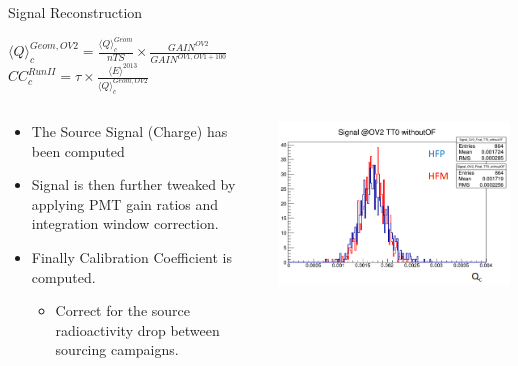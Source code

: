 \documentclass[pdf, 9pt]{beamer}
\begin{document}
  \begin{frame}{Signal Reconstruction}
    \begin{center}
      ${\langle{Q}\rangle}^{Geom,OV2}_{c} = \frac{{\langle{Q}\rangle}^{Geom}_{c}}{nTS} \times \frac{{GAIN}^{OV2}}{{GAIN}^{OV1,OV1+100}}$\\
      \vspace{0.2cm}
      ${CC}^{Run II}_{c} = \tau \times \frac{{\langle{E}\rangle}^{2013}}{{\langle{Q}\rangle}^{Geom, OV2}_{c}}$
    \end{center}
    \begin{columns}[T]
      \begin{column}{0.65\textwidth}
        \begin{itemize}
          \item The Source Signal (Charge) has been computed
          \item Signal is then further tweaked by applying PMT gain ratios and integration window correction.
          \item Finally Calibration Coefficient is computed.
            \begin{itemize}
              \item Correct for the source radioactivity drop between sourcing campaigns.
            \end{itemize}
        \end{itemize}
      \end{column}
      \begin{column}{0.35\textwidth}
        \includegraphics[width=0.99\textwidth, height=0.3\textheight]{figs/sourcing/2014/Signal_@OV2_TT0_withoutOF_FORDN.png}\\

\end{column}
\end{columns}
\end{frame}
\end{document}

